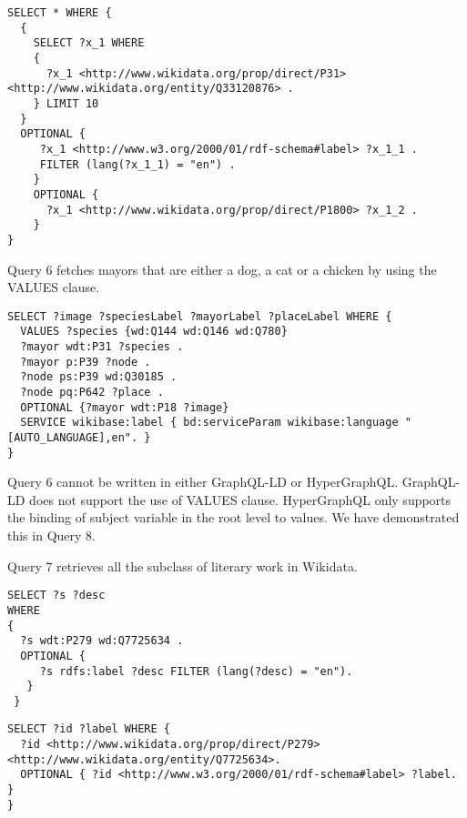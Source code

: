 \begin{minipage}{\linewidth}
\begin{lstlisting}[label=listing:listing45, caption={Query 5 - HypergraphQL}]
SELECT * WHERE {
  {
    SELECT ?x_1 WHERE
    {
      ?x_1 <http://www.wikidata.org/prop/direct/P31> <http://www.wikidata.org/entity/Q33120876> .
    } LIMIT 10
  }
  OPTIONAL {
     ?x_1 <http://www.w3.org/2000/01/rdf-schema#label> ?x_1_1 .
     FILTER (lang(?x_1_1) = "en") .
    }
    OPTIONAL {
      ?x_1 <http://www.wikidata.org/prop/direct/P1800> ?x_1_2 .
    }
}
\end{lstlisting}
\end{minipage}

Query 6 fetches mayors that are either a dog, a cat or a chicken by using the VALUES clause.

\begin{minipage}{\linewidth}
\begin{lstlisting}[label=listing:listing46, caption={Query 6}]
SELECT ?image ?speciesLabel ?mayorLabel ?placeLabel WHERE {
  VALUES ?species {wd:Q144 wd:Q146 wd:Q780}
  ?mayor wdt:P31 ?species .
  ?mayor p:P39 ?node .
  ?node ps:P39 wd:Q30185 .
  ?node pq:P642 ?place .
  OPTIONAL {?mayor wdt:P18 ?image}
  SERVICE wikibase:label { bd:serviceParam wikibase:language "[AUTO_LANGUAGE],en". }
}
\end{lstlisting}
\end{minipage}

Query 6 cannot be written in either GraphQL-LD or HyperGraphQL. GraphQL-LD does not support the use of VALUES clause. HyperGraphQL only supports the binding of subject variable in the root level to values. We have demonstrated this in Query 8.

Query 7 retrieves all the subclass of literary work in Wikidata.

\begin{minipage}{\linewidth}
\begin{lstlisting}[label=listing:listing47, caption={Query 7}]
SELECT ?s ?desc
WHERE
{
  ?s wdt:P279 wd:Q7725634 .
  OPTIONAL {
     ?s rdfs:label ?desc FILTER (lang(?desc) = "en").
   }
 }
\end{lstlisting}
\end{minipage}

\begin{minipage}{\linewidth}
\begin{lstlisting}[label=listing:listing48, caption={Query 7 - GraphQL-LD}]
SELECT ?id ?label WHERE {
  ?id <http://www.wikidata.org/prop/direct/P279> <http://www.wikidata.org/entity/Q7725634>.
  OPTIONAL { ?id <http://www.w3.org/2000/01/rdf-schema#label> ?label. }
}
\end{lstlisting}
\end{minipage}

